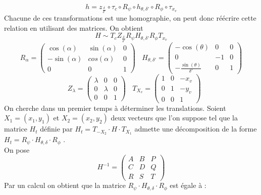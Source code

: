 \begin{equation*}
h=z_{\frac{\delta}{\delta'}} \circ \tau_{c}\circ R_{\psi} \circ h_{\theta,\delta'} \circ R_{\phi} \circ \tau_{x_{v}}
\end{equation*}
Chacune de ces transformations est une homographie, on peut donc réécrire cette relation en utilisant des matrices. On obtient 
 \begin{equation*}
H\sim T_{c} Z_{\frac{\delta}{\delta'}}  R_{\psi}  H_{\theta,\delta'} R_{\phi}  T_{x_{v}}
\end{equation*}
\begin{equation*}
R_{\alpha}=\begin{pmatrix}
\cos(\alpha)&\sin(\alpha)&0\\-\sin(\alpha)&cos(\alpha)&0\\0&0&1
\end{pmatrix}
~~~~H_{\theta,\delta'}=\begin{pmatrix}
-\cos(\theta)&0&0\\0&-1&0\\-\frac{\sin(\theta)}{\delta'}&0&1
\end{pmatrix}
\end{equation*}
\begin{equation*}
~~~~Z_{\lambda}=\begin{pmatrix}
\lambda&0&0\\0&\lambda&0\\0&0&1
\end{pmatrix}
~~~~T_{X_{v}}=\begin{pmatrix}
1&0&-x_{v}\\0&1&-y_{v}\\0&0&1
\end{pmatrix}
\end{equation*}
 On cherche dans un premier temps à déterminer les translations. Soient $X_1 = (x_1 , y_1 )$ et $X_2 = (x_2 , y_2 )$ deux vecteurs que l'on suppose tel que la matrice $H_t$ définie par $H_t = T_{-X_2}  \cdot H \cdot T_{X_1}$ admette une décomposition de la forme  $H_t=R_{\psi} \cdot H_{\theta,\delta} \cdot R_{\phi}$ .\\
 On pose 
 \begin{equation*}
 H^{-1}=\begin{pmatrix} A&B&P\\C&D&Q\\R&S&T \end{pmatrix}
 \end{equation*}
 Par un calcul on obtient que la matrice $R_{\psi} \cdot H_{\theta,\delta} \cdot R_{\phi}$ est égale à : 
